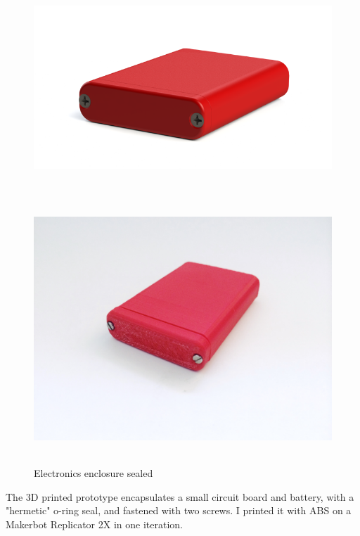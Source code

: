 \documentclass[12pt, landscape]{article}
\begin{document}
	\begin{figure}[H]
		\centering
		\includegraphics[height=2.75in]{media/enclosure_render}
		\label{enclosure_render}
	\end{figure}

	\begin{figure}[H]
		\centering
		\includegraphics[height=4in]{media/enclosure_closed}
		\caption{Electronics enclosure sealed}
		\label{enclosure_sealed}
	\end{figure}

	The 3D printed prototype encapsulates a small circuit board and battery, with a "hermetic" o-ring seal, and fastened with two screws.  I printed it with ABS on a Makerbot Replicator 2X in one iteration.
\end{document}
